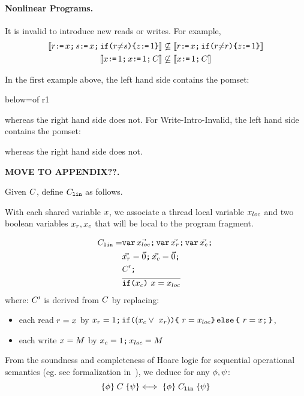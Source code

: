 \paragraph{Nonlinear Programs.}

It is invalid to introduce new reads or writes.  For example, 
\begin{align*}
  \llbracket r \texttt{:}\mkern-1mu\texttt{=}\, x \texttt{;}\,\allowbreak s \texttt{:}\mkern-1mu\texttt{=}\, x  \texttt{;}\,\allowbreak 
    \texttt{if}\allowbreak\texttt{(}r {\neq}s\texttt{)} \allowbreak\texttt{\{} z \texttt{:}\mkern-1mu\texttt{=}\, 1 \texttt{\}}\rrbracket &\not\subseteq
  \llbracket r \texttt{:}\mkern-1mu\texttt{=}\, x \texttt{;}\,\allowbreak \texttt{if}\allowbreak\texttt{(}r {\neq} r\texttt{)} \allowbreak\texttt{\{} z \texttt{:}\mkern-1mu\texttt{=}\, 1 \texttt{\}}\rrbracket
  \\
  \llbracket x \texttt{:}\mkern-1mu\texttt{=}\, 1 \texttt{;}\,\allowbreak x \texttt{:}\mkern-1mu\texttt{=}\, 1 \texttt{;}\,\allowbreak C\rrbracket &\not\subseteq
  \llbracket x \texttt{:}\mkern-1mu\texttt{=}\, 1 \texttt{;}\,\allowbreak C\rrbracket 
\end{align*}

In the first example above, the left hand side contains the pomset:
\begin{tikzdisplay}[node distance=1em]
   {below=of r1}
\end{tikzdisplay}
whereas the right hand side does not.   For Write-Intro-Invalid, the left hand side contains the pomset:
\begin{tikzdisplay}
\end{tikzdisplay}
whereas the right hand side does not.


{\bf MOVE TO APPENDIX??.  

Given $C$, define 
$C_{{\tt lin}}$ as follows.
\begin{definition}
With each shared variable $x$, we associate a thread local variable $x_{{loc}}$ and two boolean variables $x_{r},x_{c}$ that will be local to the program fragment.  

\begin{align*}
C_{{\tt lin}}= & \texttt{var}\,\vec{x_{{loc}}} \texttt{;}\,\allowbreak \texttt{var}\, \vec{x_{r}} \texttt{;}\,\allowbreak \texttt{var}\, \vec{x_{c}} \texttt{;}\,\allowbreak  \\
& \vec{x_{r}} =\vec{0} \texttt{;}\,\allowbreak \vec{x_{c}} = \vec{0} \texttt{;}\,\allowbreak \\
& C' \texttt{;}\,\allowbreak   \\
& \overline{\texttt{if}\allowbreak\texttt{(}x_{c}\texttt{)}\  x= x_{{loc}}}
\end{align*}
where:
$C'$ is derived from $C$ by replacing:
\begin{itemize}
\item  each read $r = x$ by $x_{r} = 1 \texttt{;}\,\allowbreak \texttt{if}\allowbreak\texttt{(}(x_{c} \lor\ x_{r})\texttt{)} \allowbreak\texttt{\{}\  r= x_{{loc}} \texttt{\}}\,\allowbreak\texttt{else}\allowbreak\,\texttt{\{}\  r= x \texttt{;}\,\allowbreak \texttt{\}} $,
\item each write $x = M$ by $x_{c} =1 \texttt{;}\,\allowbreak x_{{loc}} = M$
\end{itemize}
\end{definition}
From the soundness and completeness of Hoare logic for sequential operational semantics (eg. see formalization in~\citet{gordonHoare}), we deduce for any $\phi, \psi$: 
\[ \{\phi\}\allowbreak\;C\;\allowbreak\{\psi\}  \Longleftrightarrow\  \{\phi\}\allowbreak\;C_{{\tt lin}}\;\allowbreak\{\psi\} \]
}

